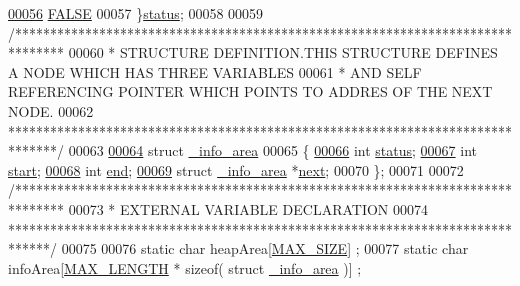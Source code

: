 \begin{DoxyCode}
\hypertarget{memory_management_8h_source_l00056}{}\hyperlink{memory_management_8h_a015eb90e0de9f16e87bd149d4b9ce959aa1e095cc966dbecf6a0d8aad75348d1a}{00056}     \hyperlink{memory_management_8h_a015eb90e0de9f16e87bd149d4b9ce959aa1e095cc966dbecf6a0d8aad75348d1a}{FALSE}
00057 \}\hyperlink{memory_management_8h_a015eb90e0de9f16e87bd149d4b9ce959}{status};
00058 
00059 \textcolor{comment}{/*******************************************************************************}
00060 \textcolor{comment}{ * STRUCTURE DEFINITION.THIS STRUCTURE DEFINES A NODE WHICH HAS THREE VARIABLES }
00061 \textcolor{comment}{ * AND SELF REFERENCING POINTER WHICH POINTS TO ADDRES OF THE NEXT NODE.}
00062 \textcolor{comment}{*******************************************************************************/}
00063 
\hypertarget{memory_management_8h_source_l00064}{}\hyperlink{memory_management_8h}{00064} \textcolor{keyword}{struct }\hyperlink{memory_management_8h_struct__info__area}{\_info\_area}
00065 \{
\hypertarget{memory_management_8h_source_l00066}{}\hyperlink{memory_management_8h_a6e27f49150e9a14580fb313cc2777e00}{00066}     \textcolor{keywordtype}{int} \hyperlink{memory_management_8h_a6e27f49150e9a14580fb313cc2777e00}{status};
\hypertarget{memory_management_8h_source_l00067}{}\hyperlink{memory_management_8h_a37722a150250e2a5a98e5e0d11e53449}{00067}     \textcolor{keywordtype}{int} \hyperlink{memory_management_8h_a37722a150250e2a5a98e5e0d11e53449}{start};
\hypertarget{memory_management_8h_source_l00068}{}\hyperlink{memory_management_8h_abce9f5dc9c83f2639b72024fdee5d388}{00068}     \textcolor{keywordtype}{int} \hyperlink{memory_management_8h_abce9f5dc9c83f2639b72024fdee5d388}{end};
\hypertarget{memory_management_8h_source_l00069}{}\hyperlink{memory_management_8h_a50e27729cb837299c9b6d2464b6ebff4}{00069}     \textcolor{keyword}{struct }\hyperlink{memory_management_8h_struct__info__area}{\_info\_area} *\hyperlink{memory_management_8h_a50e27729cb837299c9b6d2464b6ebff4}{next};
00070 \};
00071 
00072 \textcolor{comment}{/*******************************************************************************}
00073 \textcolor{comment}{ * EXTERNAL VARIABLE DECLARATION}
00074 \textcolor{comment}{ ******************************************************************************/}
00075 
00076 \textcolor{keyword}{static} \textcolor{keywordtype}{char} heapArea[\hyperlink{memory_management_8h_a0592dba56693fad79136250c11e5a7fe}{MAX\_SIZE}] ;
00077 \textcolor{keyword}{static} \textcolor{keywordtype}{char} infoArea[\hyperlink{memory_management_8h_a7a9a231e30b47bc0345749c8bd1e5077}{MAX\_LENGTH} * \textcolor{keyword}{sizeof}( \textcolor{keyword}{struct }\hyperlink{memory_management_8h_struct__info__area}{\_info\_area} )] ;

\end{DoxyCode}
